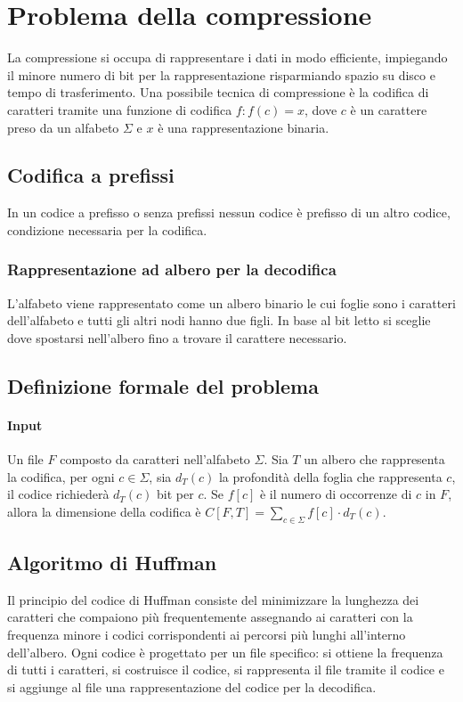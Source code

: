 	\section{Problema della compressione}
	La compressione si occupa di rappresentare i dati in modo efficiente, impiegando il minore numero di bit per la rappresentazione risparmiando spazio su disco e tempo di trasferimento.
	Una possibile tecnica di compressione \`e la codifica di caratteri tramite una funzione di codifica $f:f(c) = x$, dove $c$ \`e un carattere preso da un alfabeto $\Sigma$ e $x$ \`e una
	rappresentazione binaria. 
	\subsection{Codifica a prefissi}
	In un codice a prefisso o senza prefissi nessun codice \`e prefisso di un altro codice, condizione necessaria per la codifica. 
	\subsubsection{Rappresentazione ad albero per la decodifica}
	L'alfabeto viene rappresentato come un albero binario le cui foglie sono i caratteri dell'alfabeto e tutti gli altri nodi hanno due figli. In base al bit letto si sceglie dove spostarsi
	nell'albero fino a trovare il carattere necessario.\\
	
	\subsection{Definizione formale del problema}
	\paragraph{Input}
	Un file $F$ composto da caratteri nell'alfabeto $\Sigma$. Sia $T$ un albero che rappresenta la codifica, per ogni $c\in\Sigma$, sia $d_T(c)$ la profondit\`a della foglia che rappresenta
	$c$, il codice richieder\`a $d_T(c)$ bit per $c$. Se $f[c]$ \`e il numero di occorrenze di $c$ in $F$, allora la dimensione della codifica \`e $C[F, T] = \sum\limits_{c\in\Sigma}f[c]
	\cdot d_T(c)$.
	\subsection{Algoritmo di Huffman}
	Il principio del codice di Huffman consiste del minimizzare la lunghezza dei caratteri che compaiono pi\`u frequentemente assegnando ai caratteri con la frequenza minore i codici 
	corrispondenti ai percorsi pi\`u lunghi all'interno dell'albero. Ogni codice \`e progettato per un file specifico: si ottiene la frequenza di tutti i caratteri, si costruisce il 
	codice, si rappresenta il file tramite il codice e si aggiunge al file una rappresentazione del codice per la decodifica. 
